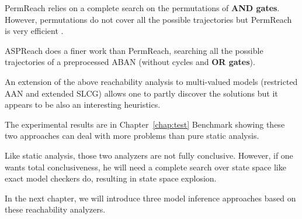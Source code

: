 PermReach relies on a complete search on the permutations of \textbf{AND gates}.
However, permutations do not cover all the possible trajectories but PermReach is very efficient .

ASPReach does a finer work than PermReach, searching all the possible trajectories of a preprocessed ABAN (without cycles and \textbf{OR gates}).

An extension of the above reachability analysis to multi-valued models (restricted AAN and extended SLCG) allows one to partly discover the solutions but it appears to be also an interesting heuristics. 

The experimental results are in Chapter~\ref{chap:test} Benchmark showing these two approaches can deal with more problems than pure static analysis.

Like static analysis, those two analyzers are not fully conclusive.
However, if one wants total conclusiveness, he will need a complete search over state space like exact model checkers do, resulting in state space explosion.

In the next chapter, we will introduce three model inference approaches based on these reachability analyzers.